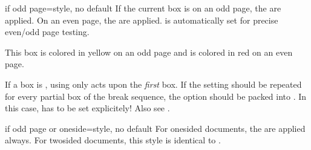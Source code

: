 \enlargethispage*{1cm}
\begin{docTcbKey}[][doc new=2015-11-13]{if odd page}{=}{style, no default}
If the current box is on an odd page, the  are applied.
On an even page, the  are applied.
 is automatically set for precise even/odd page testing.

\begin{dispExample}
\begin{tcolorbox}[if odd page={colback=yellow!50}{colback=red!50}]
  This box is colored in yellow on an odd page
  and is colored in red on an even page.
\end{tcolorbox}
\end{dispExample}

\begin{marker}
If a box is , using 
only acts upon the \emph{first} box. If the setting should be
repeated for every partial box of the break sequence, the option should be
packed into . In this case, 
has to be set explicitely! Also see .
\end{marker}
\end{docTcbKey}


\begin{docTcbKey}[][doc new=2016-11-18]{if odd page or oneside}{=}{style, no default}
  For onesided documents, the  are applied always.
  For twosided documents, this style is identical to .
\end{docTcbKey}


